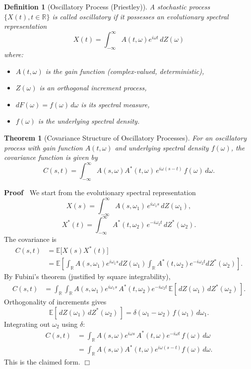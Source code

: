 \documentclass{article}
\newenvironment{proof}{\noindent\textbf{Proof\ }}{\hspace*{\fill}$\Box$\medskip}
\newtheorem{definition}{Definition}
\newtheorem{theorem}{Theorem}
\begin{document}
\begin{definition}
  [Oscillatory Process (Priestley)] A stochastic process $\{X (t), t \in
  \mathbb{R}\}$ is called oscillatory if it possesses an evolutionary spectral
  representation
  \begin{equation}
    X (t) = \int_{- \infty}^{\infty} A (t, \omega) e^{i \omega t} \, dZ (\omega)
  \end{equation}
  where:
  \begin{itemize}
  \item $A (t, \omega)$ is the gain function (complex-valued, deterministic),
  \item $Z (\omega)$ is an orthogonal increment process,
  \item $dF (\omega) = f (\omega) \, d \omega$ is its spectral measure,
  \item $f (\omega)$ is the underlying spectral density.
  \end{itemize}
\end{definition}
\begin{theorem}[Covariance Structure of Oscillatory Processes]\label{thm:cov}
  For an oscillatory process with gain function $A (t, \omega)$ and underlying spectral density $f
  (\omega)$, the covariance function is given by
  \begin{equation}
    C (s, t) = \int_{- \infty}^{\infty} A (s, \omega) A^{\ast} (t, \omega) \, e^{i\omega(s-t)} \, f
    (\omega) \, d \omega.
  \end{equation}
\end{theorem}

\begin{proof}
We start from the evolutionary spectral representation
\[
X(s) = \int_{-\infty}^\infty A(s,\omega_1)\, e^{i\omega_1 s} \, dZ(\omega_1),
\]
\[
X^*(t) = \int_{-\infty}^\infty A^*(t,\omega_2)\, e^{-i\omega_2 t} \, dZ^*(\omega_2).
\]
The covariance is
\begin{align*}
C(s,t) &= \mathbb{E}\big[ X(s) X^*(t) \big] \\
&= \mathbb{E}\left[ \int_{\mathbb{R}} A(s,\omega_1)e^{i\omega_1 s}dZ(\omega_1)
        \int_{\mathbb{R}} A^*(t,\omega_2) e^{-i\omega_2 t}dZ^*(\omega_2) \right].
\end{align*}
By Fubini's theorem (justified by square integrability),
\begin{align*}
C(s,t) &= \int_{\mathbb{R}} \int_{\mathbb{R}} 
     A(s,\omega_1) e^{i\omega_1 s} \, A^*(t,\omega_2) e^{-i\omega_2 t} \,
     \mathbb{E}[\,dZ(\omega_1)\,dZ^*(\omega_2)\,] .
\end{align*}
Orthogonality of increments gives
\[
\mathbb{E}[\,dZ(\omega_1)\, dZ^*(\omega_2)\,] =
       \delta(\omega_1 - \omega_2) \, f(\omega_1)\, d\omega_1 .
\]
Integrating out $\omega_2$ using $\delta$:
\begin{align*}
C(s,t) &= \int_{\mathbb{R}} A(s,\omega) e^{i\omega s} \, A^*(t,\omega) e^{-i\omega t} \,
    f(\omega) \, d\omega \\
&= \int_{\mathbb{R}} A(s,\omega) A^*(t,\omega) e^{i\omega(s-t)} f(\omega)\, d\omega.
\end{align*}
This is the claimed form.
\end{proof}
\end{document}
